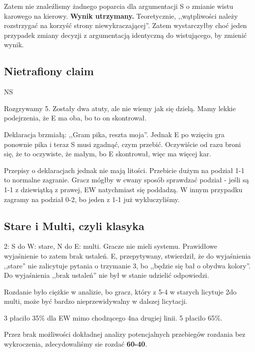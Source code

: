 \documentclass[12pt, a4paper]{article}
\newcounter{board}
\newcommand\nextboard{\stepcounter{board}\theboard}
\begin{document}
Zatem nie znaleźlismy żadnego poparcia dla argumentacji S o zmianie 
wistu karowego na kierowy. \textbf{Wynik utrzymany.} Teoretycznie, 
,,wątpliwości należy rozstrzygać na korzyść strony niewykraczającej''. 
Zatem wystarczyłby choć jeden przypadek zmiany decyzji z argumentacją identyczną
do wistującego, by zmienić wynik.


\subsection*{Nietrafiony claim}

\handdiagramv[\nextboard]{}
				{}
                {}
                {}{NS}

Rozgrywamy 5\diams\dbl. Zostały dwa atuty, ale nie wiemy jak się dzielą.
Mamy lekkie podejrzenia, że E ma oba, bo to on skontrował.

Deklaracja brzmiałą: ,,Gram pika, reszta moja''. Jednak E po wzięciu
gra ponownie pika i teraz S musi zgadnąć, czym przebić. Oczywiście od razu broni się,
że to oczywiste, że małym, bo E skontrował, więc ma więcej kar.

Przepisy o deklaracjach jednak nie mają litości. Przebicie dużym na podział 1-1
to normalne zagranie. Gracz mógłby w cwany sposób sprawdzać podział - jeśli są 1-1 z
dziewiątką z prawej, EW natychmiast się poddadzą. W innym przypadku zagramy na podział 0-2,
bo jeden z 1-1 już wykluczyliśmy. 


\subsection*{Stare i Multi, czyli klasyka}

\handdiagramv[\nextboard]{\vhand{T832}{AJ642}{Q62}{8}}
				{}
                {}
                {}{}


2\diams: S do W: stare, N do E: multi. Gracze nie mieli systemu.
Prawidłowe wyjaśnienie to zatem brak ustaleń.
E, przepytywany, stwierdził, że do wyjaśnienia ,,stare'' nie zalicytuje 
pytania o trzymanie 3\hearts, bo ,,będzie się bał o obydwa kolory''.
Do wyjaśnienia ,,brak ustaleń'' nie był w stanie udzielić odpowiedzi.

Rozdanie było ciężkie w analizie, bo gracz, który z 5-4 w starych 
licytuje 2\hearts do multi, może być bardzo nieprzewidywalny w dalszej licytacji.

3 płaciło 35\% dla EW mimo chodzącego 4\major na drugiej linii.
5 płaciło 65\%.

Przez brak możliwości dokładnej analizy potencjalnych przebiegów rozdania
bez wykroczenia, zdecydowaliśmy sie rozdać \textbf{60-40}.
\end{document}

